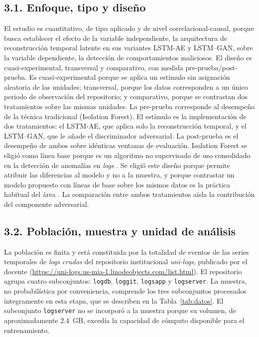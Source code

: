 \documentclass[jou,a4paper,floatsintext,donotrepeattitle]{apa7}
\begin{document}
\subsection{3.1. Enfoque, tipo y diseño}
El estudio es cuantitativo, de tipo aplicado y de nivel correlacional-causal, porque busca establecer el efecto de la variable independiente, la arquitectura de reconstrucción temporal latente en sus variantes LSTM-AE y LSTM--GAN, sobre la variable dependiente, la detección de comportamientos maliciosos. El diseño es cuasi-experimental, transversal y comparativo, con medida pre-prueba/post-prueba. Es cuasi-experimental porque se aplica un estímulo sin asignación aleatoria de las unidades; transversal, porque los datos corresponden a un único periodo de observación del repositorio; y comparativo, porque se contrastan dos tratamientos sobre las mismas unidades. La pre-prueba corresponde al desempeño de la técnica tradicional (Isolation Forest). El estímulo es la implementación de dos tratamientos: el LSTM-AE, que aplica solo la reconstrucción temporal, y el LSTM--GAN, que le añade el discriminador adversarial. La post-prueba es el desempeño de ambos sobre idénticas ventanas de evaluación. Isolation Forest se eligió como línea base porque es un algoritmo no supervisado de uso consolidado en la detección de anomalías en \textit{logs} \parencite{farzad2020}. Se eligió este diseño porque permite atribuir las diferencias al modelo y no a la muestra, y porque contrastar un modelo propuesto con líneas de base sobre los mismos datos es la práctica habitual del área \parencite{nasirzadeh2025,zhao2025}. La comparación entre ambos tratamientos aísla la contribución del componente adversarial.

\subsection{3.2. Población, muestra y unidad de análisis}
La población es finita y está constituida por la totalidad de eventos de las series temporales de \textit{logs} \emph{crudos} del repositorio institucional \textit{uni-logs}, publicado por el docente (\url{https://uni-logs.us-mia-1.linodeobjects.com/list.html}). El repositorio agrupa cuatro subconjuntos: \texttt{logdb}, \texttt{loggit}, \texttt{logsapp} y \texttt{logserver}. La muestra, no probabilística por conveniencia, comprende los tres subconjuntos procesados íntegramente en esta etapa, que se describen en la Tabla~\ref{tab:datos}. El subconjunto \texttt{logserver} no se incorporó a la muestra porque su volumen, de aproximadamente 2.4~GB, excedía la capacidad de cómputo disponible para el entrenamiento.
\end{document}
